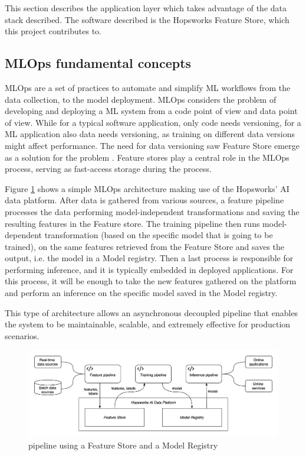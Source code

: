 This section describes the application layer which takes advantage of the data stack described. The software described is the Hopsworks Feature Store, which this project contributes to.

\subsection{MLOps fundamental concepts}

\gls{MLOps} are a set of practices to automate and simplify \gls{ML} workflows from the data collection, to the model deployment. \gls{MLOps} considers the problem of developing and deploying a \gls{ML} system from a code point of view and data point of view. While for a typical software application, only code needs versioning, for a \gls{ML} application also data needs versioning, as training on different data versions might affect performance. The need for data versioning saw Feature Store emerge as a solution for the problem \cite{MeetMichelangeloUbers2017}. Feature stores play a central role in the \gls{MLOps} process, serving as fast-access storage during the process.

Figure \ref{fig:mlops} shows a simple \gls{MLOps} architecture making use of the Hopsworks' AI data platform. After data is gathered from various sources, a feature pipeline processes the data performing model-independent transformations and saving the resulting features in the Feature store. The training pipeline then runs model-dependent transformation (based on the specific model that is going to be trained), on the same features retrieved from the Feature Store and saves the output, i.e. the model in a Model registry. Then a last process is responsible for performing inference, and it is typically embedded in deployed applications. For this process, it will be enough to take the new features gathered on the platform and perform an inference on the specific model saved in the Model registry.

This type of architecture allows an asynchronous decoupled pipeline that enables the system to be maintainable, scalable, and extremely effective for production scenarios.

\begin{figure}[!ht]
    \begin{center}
      \includegraphics[width=\textwidth]{figures/2-background/MLOps.png}
    \end{center}
    \caption{ pipeline using a Feature Store and a Model Registry}
    \label{fig:mlops}
\end{figure}


